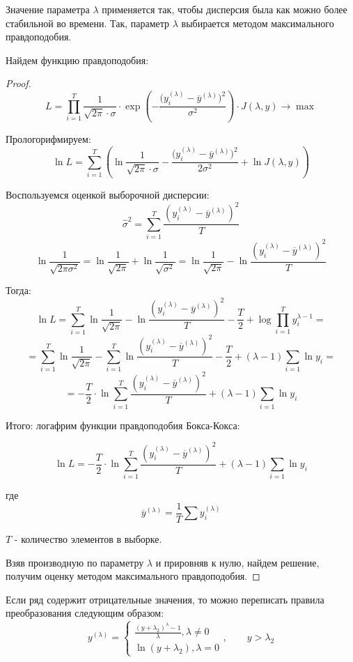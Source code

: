 \documentclass[aps,%
12pt,%
final,%
oneside,
onecolumn,%
musixtex, %
superscriptaddress,%
centertags]{article} %
\theoremstyle{plain}
\theoremstyle{definition}
\theoremstyle{remark}
\begin{document}
Значение параметра $\lambda$ применяется так, чтобы дисперсия была как можно более стабильной во времени. Так, параметр $\lambda$ выбирается методом максимального правдоподобия. 

Найдем функцию правдоподобия:

\begin{proof}
	$$ L = \prod_{i=1}^{T} {\frac{1}{\sqrt{2\pi}\cdot \sigma}} \cdot \exp \left ( {-\frac{({y_i^{(\lambda)} - \overline{y}^{(\lambda)})^2}}{\sigma^2}}\right) \cdot J(\lambda,y) \to \max $$

	Прологорифмируем:
	$$ \ln L = \sum_{i=1}^{T} \left ( \ln \frac{1}{\sqrt{2\pi}\cdot \sigma}  - \frac{({y_i^{(\lambda)} - \overline{y}^{(\lambda)})^2} }{2\sigma^2} + \ln J(\lambda,y) \right )  $$

	Воспользуемся оценкой выборочной дисперсии:
	$$ \hat{\sigma}^2 = \sum_{i=1}^{T} \frac{({y_i^{(\lambda)} - \overline{y}^{(\lambda)}})^2}{T} $$
	$$ \ln \frac{1}{\sqrt{2\pi \sigma^2}} = \ln \frac{1}{\sqrt{2\pi}} + \ln \frac{1}{\sqrt {\sigma^2}} = \ln \frac{1}{\sqrt{2\pi}} - \ln \frac{({y_i^{(\lambda)} - \overline{y}^{(\lambda)}})^2}{T}$$ 

	Тогда:
	$$ \ln L = \sum_{i=1}^{T} \ln \frac{1}{\sqrt{2\pi}} - \ln \frac{({y_i^{(\lambda)} - \overline{y}^{(\lambda)}})^2}{T} - \frac{T}{2} + \log \prod_{i=1}^{T} y_{i}^{\lambda - 1} = $$ 
	$$ = \sum_{i=1}^{T} \ln \frac{1}{\sqrt{2\pi}} - \sum_{i=1}^{T} \ln \frac{({y_i^{(\lambda)} - \overline{y}^{(\lambda)}})^2}{T} - \frac{T}{2} + (\lambda - 1) \sum_{i=1} \ln y_{i} =$$
	$$=  -\frac{T}{2} \cdot \ln \sum_{i=1}^{T} \frac{({y_i^{(\lambda)} - \overline{y}^{(\lambda)}})^2}{T} + (\lambda - 1) \sum_{i=1} \ln y_{i} $$

	Итого: логафрим функции правдоподобия Бокса-Кокса:

	$$ \ln L = -\frac{T}{2} \cdot \ln \sum_{i=1}^{T} \frac{({y_i^{(\lambda)} - \overline{y}^{(\lambda)}})^2}{T} + (\lambda - 1) \sum_{i=1} \ln y_{i} $$

	где $$\overline{y}^{(\lambda)} = \frac{1}{T} \sum y_i^{(\lambda)} $$

	$ T $ - количество элементов в выборке.

	Взяв производную по параметру $\lambda$ и прировняв к нулю, найдем решение, получим оценку методом максимального правдоподобия.
\end{proof}

Если ряд содержит отрицательные значения, то можно переписать правила преобразования следующим образом:
$$y^{(\lambda)} = 
\begin{cases}
\frac{(y+\lambda_2)^{\lambda}-1}{\lambda}, \lambda \neq 0 \\
\ln (y+\lambda_2), \lambda = 0
\end{cases}  , \qquad y > \lambda_2$$
\end{document}

